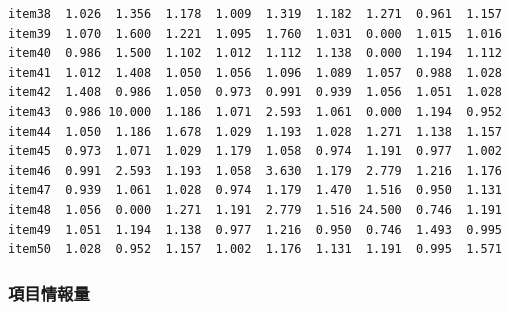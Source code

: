 \documentclass[
  a4paper,
]{ltjsbook}
\newenvironment{Shaded}{\begin{snugshade}}{\end{snugshade}}
\newcommand{\NormalTok}[1]{\textcolor[rgb]{0.00,0.23,0.31}{#1}}
\newcommand{\SpecialCharTok}[1]{\textcolor[rgb]{0.37,0.37,0.37}{#1}}
\begin{document}
\begin{verbatim}
item38  1.026  1.356  1.178  1.009  1.319  1.182  1.271  0.961  1.157
item39  1.070  1.600  1.221  1.095  1.760  1.031  0.000  1.015  1.016
item40  0.986  1.500  1.102  1.012  1.112  1.138  0.000  1.194  1.112
item41  1.012  1.408  1.050  1.056  1.096  1.089  1.057  0.988  1.028
item42  1.408  0.986  1.050  0.973  0.991  0.939  1.056  1.051  1.028
item43  0.986 10.000  1.186  1.071  2.593  1.061  0.000  1.194  0.952
item44  1.050  1.186  1.678  1.029  1.193  1.028  1.271  1.138  1.157
item45  0.973  1.071  1.029  1.179  1.058  0.974  1.191  0.977  1.002
item46  0.991  2.593  1.193  1.058  3.630  1.179  2.779  1.216  1.176
item47  0.939  1.061  1.028  0.974  1.179  1.470  1.516  0.950  1.131
item48  1.056  0.000  1.271  1.191  2.779  1.516 24.500  0.746  1.191
item49  1.051  1.194  1.138  0.977  1.216  0.950  0.746  1.493  0.995
item50  1.028  0.952  1.157  1.002  1.176  1.131  1.191  0.995  1.571
\end{verbatim}

\subsubsection{項目情報量}\label{ux9805ux76eeux60c5ux5831ux91cf}

\begin{Shaded}
\end{Shaded}
\end{document}
